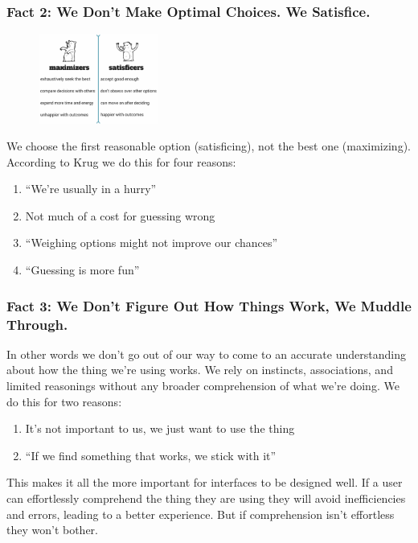 \documentclass{article}%
\begin{document}
  \subsubsection{Fact 2: We Don't Make Optimal Choices. We Satisfice.}
  \begin{figure}
    \centering
    \includegraphics[width=0.35\textwidth]{maximizer1}
  \end{figure}
    We choose the first reasonable option (satisficing), not the best one (maximizing). \newline
    According to Krug we do this for four reasons:
    \begin{enumerate}
      \item ``We're usually in a hurry''
      \item Not much of a cost for guessing wrong
      \item ``Weighing options might not improve our chances''
      \item ``Guessing is more fun''
    \end{enumerate}

  \subsubsection{Fact 3: We Don't Figure Out How Things Work, We Muddle Through.}
    In other words we don't go out of our way to come to an accurate understanding
    about how the thing we're using works. We rely on instincts, associations, and
    limited reasonings without any broader comprehension of what we're doing.\newline
    We do this for two reasons:
    \begin{enumerate}
      \item It's not important to us, we just want to use the thing
      \item ``If we find something that works, we stick with it''
    \end{enumerate}
    This makes it all the more important for interfaces to be designed well. If a user
    can effortlessly comprehend the thing they are using they will avoid inefficiencies
    and errors, leading to a better experience. But if comprehension isn't effortless
    they won't bother.
\end{document}
